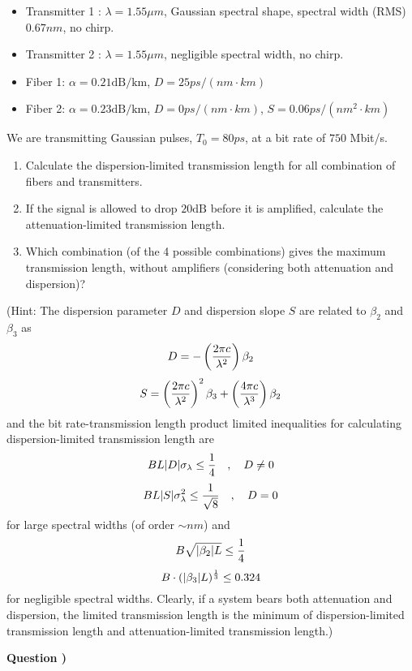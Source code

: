 \documentclass[10pt,letterpaper]{article}
\newcounter{QuestionNumber}
\newcommand{\Q}{
\textbf{Question \theQuestionNumber)}
\stepcounter{QuestionNumber}
}
\newcommand{\nl}{\newline\newline}
\begin{document}
\begin{itemize}
\item
Transmitter 1 : $\lambda=1.55\mu m$, Gaussian spectral shape, spectral width (RMS) $0.67 nm$, no chirp.

\item
Transmitter 2 : $\lambda=1.55\mu m$, negligible spectral width, no chirp.

\item
Fiber 1: $\alpha=0.21 \text{dB}/\text{km}$, $D=25 ps/(nm\cdot km)$

\item
Fiber 2: $\alpha=0.23 \text{dB}/\text{km}$, $D=0 ps/(nm\cdot km)$, $S=0.06 ps/(nm^2\cdot km)$
\end{itemize}
We are transmitting Gaussian pulses, $T_0=80 ps$, at a bit rate of $750$ Mbit/s.
\begin{enumerate}[label=\alph*.]
\item
Calculate the dispersion-limited transmission length for all combination of fibers and transmitters.
\item
If the signal is allowed to drop $20\text{dB}$ before it is amplified, calculate the attenuation-limited transmission length.
\item
Which combination (of the 4 possible combinations) gives the maximum transmission length, without amplifiers (considering both attenuation and dispersion)?
\end{enumerate}
(Hint:
 The dispersion parameter $D$ and dispersion slope $S$ are related to $\beta_2$ and $\beta_3$ as
$$
D=-\left({2\pi c\over \lambda^2}\right)\beta_2
$$
$$
S=\left({2\pi c\over \lambda^2}\right)^2\beta_3+\left({4\pi c\over \lambda^3}\right)\beta_2
$$
and the bit rate-transmission length product limited inequalities for calculating dispersion-limited transmission length are
$$
BL|D|\sigma_\lambda\le{1\over 4}\quad,\quad D\ne 0
$$
$$
BL|S|\sigma_\lambda^2\le{1\over \sqrt8}\quad,\quad D= 0
$$
for large spectral widths (of order $\sim nm$) and 
$$
B\sqrt{|\beta_2| L}\le{1\over 4}
$$
$$
B\cdot(|\beta_3| L)^{1\over 3}\le{0.324}
$$
for negligible spectral widths. Clearly, if a system bears both attenuation and dispersion, the limited transmission length is the minimum of dispersion-limited transmission length and attenuation-limited transmission length.)
\nl
\Q
\end{document}
